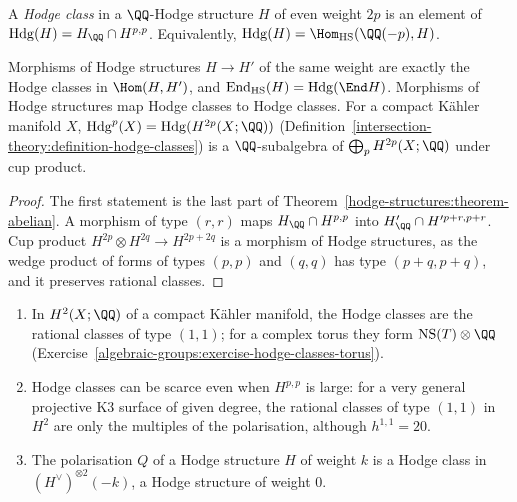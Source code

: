 \begin{definition}\label{hodge-structures:definition-hodge-classes}
A \emph{Hodge class} in a $\QQ$-Hodge structure $H$ of even weight $2p$ is an element of $\mathrm{Hdg}(H) = H_\QQ \cap H^{p,p}$. Equivalently, $\mathrm{Hdg}(H) = \Hom_{\mathrm{HS}}(\QQ(-p), H)$.
\end{definition}

\begin{proposition}\label{hodge-structures:proposition-hodge-classes-morphisms}
Morphisms of Hodge structures $H \to H'$ of the same weight are exactly the Hodge classes in $\Hom(H, H')$, and $\mathrm{End}_{\mathrm{HS}}(H) = \mathrm{Hdg}(\End H)$. Morphisms of Hodge structures
map Hodge classes to Hodge classes. For a compact K\"ahler manifold $X$, $\mathrm{Hdg}^p(X) = \mathrm{Hdg}(H^{2p}(X; \QQ))$ (Definition~\ref{intersection-theory:definition-hodge-classes}) is a
$\QQ$-subalgebra of $\bigoplus_pH^{2p}(X; \QQ)$ under cup product.
\end{proposition}

\begin{proof}
The first statement is the last part of Theorem~\ref{hodge-structures:theorem-abelian}. A morphism of type $(r,r)$ maps $H_\QQ \cap H^{p,p}$ into $H'_\QQ \cap H'^{p+r,p+r}$. Cup product
$H^{2p} \otimes H^{2q} \to H^{2p+2q}$ is a morphism of Hodge structures, as the wedge product of forms of types $(p,p)$ and $(q,q)$ has type $(p+q,p+q)$, and it preserves rational classes.
\end{proof}

\begin{example}\label{hodge-structures:example-hodge-classes}
\begin{enumerate}
\item In $H^2(X; \QQ)$ of a compact K\"ahler manifold, the Hodge classes are the rational classes of type $(1,1)$; for a complex torus they form $\mathrm{NS}(T) \otimes \QQ$
(Exercise~\ref{algebraic-groups:exercise-hodge-classes-torus}).
\item Hodge classes can be scarce even when $H^{p,p}$ is large: for a very general projective K3 surface of given degree, the rational classes of type $(1,1)$ in $H^2$ are only the
multiples of the polarisation, although $h^{1,1} = 20$.
\item The polarisation $Q$ of a Hodge structure $H$ of weight $k$ is a Hodge class in $(H^\vee)^{\otimes 2}(-k)$, a Hodge structure of weight $0$.
\end{enumerate}
\end{example}

